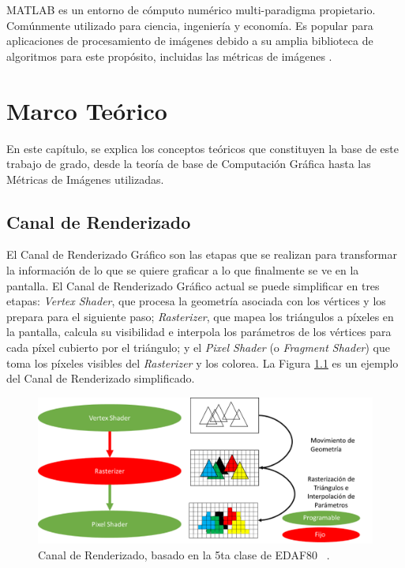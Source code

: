 \documentclass[pregrado]{tesis-usb} %
\begin{document}
MATLAB es un entorno de cómputo numérico multi-paradigma propietario. Comúnmente utilizado para ciencia, ingeniería y economía. Es popular para aplicaciones de procesamiento de imágenes debido a su amplia biblioteca de algoritmos para este propósito, incluidas las métricas de imágenes \cite{Doggett2017EDAF80, themathworks2018}.



\chapter{Marco Teórico}
En este capítulo, se explica los conceptos teóricos que constituyen la base de este trabajo de grado, desde la teoría de base de Computación Gráfica hasta las Métricas de Imágenes utilizadas.

\section{Canal de Renderizado}
El Canal de Renderizado Gráfico son las etapas que se realizan para transformar la información de lo que se quiere graficar a lo que finalmente se ve en la pantalla. El Canal de Renderizado Gráfico actual se puede simplificar en tres etapas: \textit{Vertex Shader}, que procesa la geometría asociada con los vértices y los prepara para el siguiente paso; \textit{Rasterizer}, que mapea los triángulos a píxeles en la pantalla, calcula su visibilidad e interpola los parámetros de los vértices para cada píxel cubierto por el triángulo; y el \textit{Pixel Shader} (o \textit{Fragment Shader}) que toma los píxeles visibles del \textit{Rasterizer} y los colorea. La Figura \ref{fig:graphpipeline} es un ejemplo del Canal de Renderizado simplificado.

\begin{figure}[!hbt]
	\centering
	\includegraphics[scale=0.7]{images/graphics_pipeline.png} 
	\caption{Canal de Renderizado, basado en la 5ta clase de EDAF80 ~\cite{Doggett2017EDAF80}.}\label{fig:graphpipeline}
\end{figure}
\end{document}
